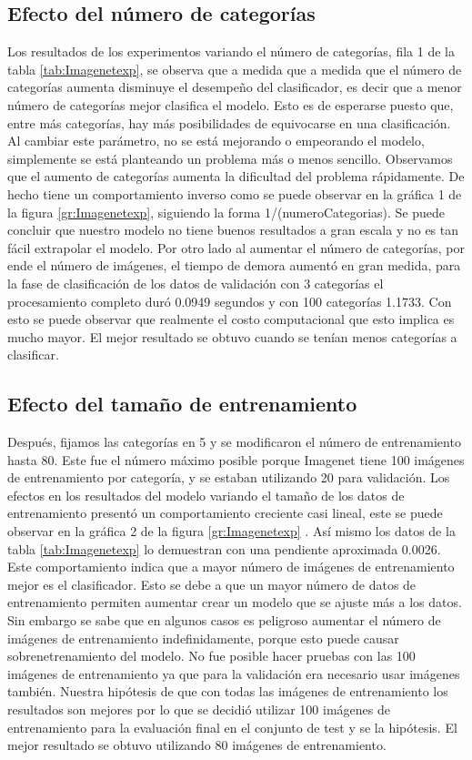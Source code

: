 \documentclass[10pt,twocolumn,letterpaper]{article}
\begin{document}
\subsection{Efecto del número de categorías}
Los resultados de los experimentos variando el número de categorías, fila 1 de la tabla \ref{tab:Imagenetexp}, se observa que a medida que a medida que el número de categorías aumenta disminuye el desempeño del clasificador, es decir que a menor número de categorías mejor clasifica el modelo. Esto es de esperarse puesto que, entre más categorías, hay más posibilidades de equivocarse en una clasificación. Al cambiar este parámetro, no se está mejorando o empeorando el modelo, simplemente se está planteando un  problema más o menos sencillo. Observamos que el aumento de categorías aumenta la dificultad del problema rápidamente. De hecho tiene un comportamiento inverso como se puede observar en la gráfica 1 de la figura \ref{gr:Imagenetexp}, siguiendo la forma 1/(numeroCategorias). Se puede concluir que nuestro modelo no tiene buenos resultados a gran escala y no es tan fácil extrapolar el modelo. Por otro lado al aumentar el número de categorías, por ende el número de imágenes, el tiempo de demora aumentó en gran medida, para la fase de clasificación de los datos de validación con 3 categorías el procesamiento completo duró 0.0949 segundos y con 100 categorías 1.1733. Con esto se puede observar que realmente el costo computacional que esto implica es mucho mayor. El mejor resultado se obtuvo cuando se tenían menos categorías a clasificar.

\subsection{Efecto del tamaño de entrenamiento}
Después, fijamos las categorías en 5 y se modificaron el número de entrenamiento hasta 80. Este fue el número máximo posible porque Imagenet tiene 100 imágenes de entrenamiento por categoría, y se estaban utilizando 20 para validación. Los efectos en los resultados del modelo variando el tamaño de los datos de entrenamiento presentó un comportamiento creciente casi lineal, este se puede observar en la gráfica 2 de la figura \ref{gr:Imagenetexp} . Así mismo los datos de la tabla \ref{tab:Imagenetexp} lo demuestran con una pendiente aproximada 0.0026. Este comportamiento indica que a mayor número de imágenes de entrenamiento mejor es el clasificador. Esto se debe a que un mayor número de datos de entrenamiento permiten aumentar crear un modelo que se ajuste más a los datos. Sin embargo se sabe que en algunos casos es peligroso aumentar el número de imágenes de entrenamiento indefinidamente, porque esto puede causar sobrenetrenamiento del modelo. No fue posible hacer pruebas con las 100 imágenes de entrenamiento ya que para la validación era necesario usar imágenes también. Nuestra hipótesis de que con todas las imágenes de entrenamiento los resultados son mejores por lo que se decidió utilizar 100 imágenes de entrenamiento para la evaluación final en el conjunto de test y se la hipótesis. El mejor resultado se obtuvo utilizando 80 imágenes de entrenamiento.
\end{document}
